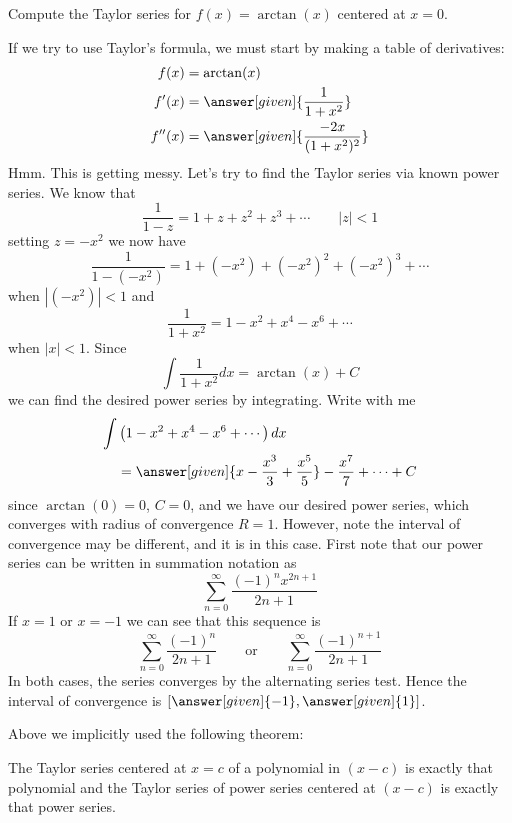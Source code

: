 \documentclass{ximera}
\begin{document}
\begin{example}
  Compute the Taylor series for $f(x) = \arctan(x)$ centered at $x=0$.
  \begin{explanation}
    If we try to use Taylor's formula, we must start by making a table
    of derivatives:
    \begin{align*}
      f(x) &= \arctan(x)\\
      f'(x) &= \answer[given]{\frac{1}{1+x^2}}\\
      f''(x) &= \answer[given]{\frac{-2x}{(1+x^2)^2}}
    \end{align*}
    Hmm. This is getting messy. Let's try to find the Taylor series
    via known power series. We know that
    \[
    \frac{1}{1-z} = 1+ z+ z^2 + z^3 + \cdots \qquad |z|< 1
    \]
    setting $z = -x^2$ we now have
    \[
    \frac{1}{1-(-x^2)} = 1 + (-x^2)+ (-x^2)^2 + (-x^2)^3 + \cdots
    \]
    when $|(-x^2)|< 1$ and
    \[
    \frac{1}{1+x^2} = 1 - x^2 + x^4 - x^6 + \cdots 
    \]
    when $|x|< 1$. Since
    \[
    \int\frac{1}{1+x^2} dx = \arctan(x) + C
    \]
    we can find the desired power series by integrating. Write with me
    \begin{align*}
      \int &\left(1 - x^2 + x^4 - x^6 + \cdots\right) dx \\
      &= \answer[given]{x - \frac{x^3}{3} + \frac{x^5}{5}} - \frac{x^7}{7} + \cdots +C
    \end{align*}
    since $\arctan(0) = 0$, $C=0$, and we have our desired power
    series, which converges with radius of convergence $R=1$. However,
    note the interval of convergence may be different, and it is in
    this case. First note that our power series can be written in summation notation as
    \[
    \sum_{n=0}^\infty \frac{(-1)^n x^{2n+1}}{2n+1}
    \]
    If $x=1$ or $x=-1$ we can see that this sequence is
    \[
    \sum_{n=0}^\infty \frac{(-1)^n}{2n+1}\qquad\text{or}\qquad\sum_{n=0}^\infty \frac{(-1)^{n+1}}{2n+1}
    \]
    In both cases, the series converges by the alternating series
    test. Hence the interval of convergence is $[\answer[given]{-1},\answer[given]{1}]$.
  \end{explanation}
\end{example}

Above we implicitly used the following theorem:


\begin{theorem}
  The Taylor series centered at $x=c$ of a polynomial in $(x-c)$ is
  exactly that polynomial and the Taylor series of power series
  centered at $(x-c)$ is exactly that power series.
\end{theorem}
\end{document}
